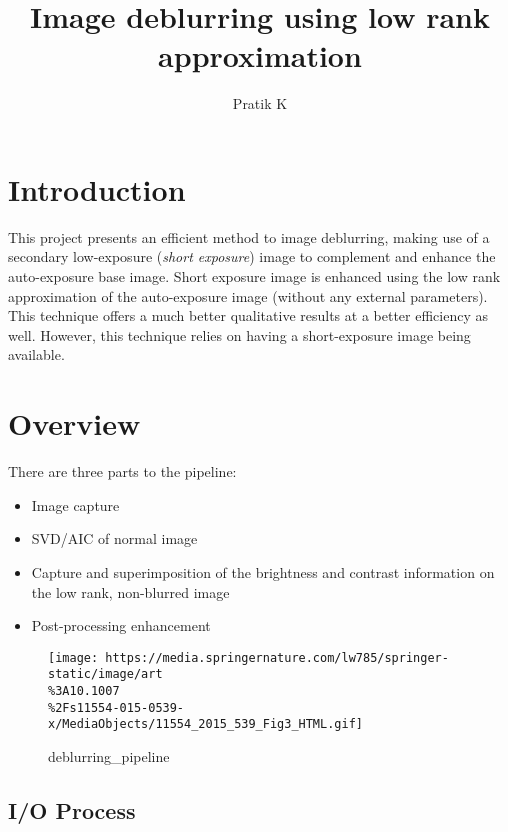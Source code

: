 \title{Image deblurring using low rank approximation}
\author{Pratik K}



\maketitle

\hypertarget{introduction}{%
\section{Introduction}\label{introduction}}

This project presents an efficient method to image deblurring, making
use of a secondary low-exposure (\emph{short exposure}) image to
complement and enhance the auto-exposure base image. Short exposure
image is enhanced using the low rank approximation of the auto-exposure
image (without any external parameters). This technique offers a much
better qualitative results at a better efficiency as well. However, this
technique relies on having a short-exposure image being available.

\hypertarget{overview}{%
\section{Overview}\label{overview}}

There are three parts to the pipeline:

\begin{itemize}
  \tightlist
  \item
  Image capture
  \item
  SVD/AIC of normal image
  \item
  Capture and superimposition of the brightness and contrast information
  on the low rank, non-blurred image
  \item
  Post-processing enhancement
\end{itemize}

\begin{figure}
  \begin{center}
  \texttt{[image: https://media.springernature.com/lw785/springer-static/image/art\\\%3A10.1007\\\%2Fs11554-015-0539-x/MediaObjects/11554\_2015\_539\_Fig3\_HTML.gif]}
  \caption{deblurring\_pipeline}
  \end{center}
\end{figure}

\hypertarget{io-process}{%
\subsection{I/O Process}\label{io-process}}

